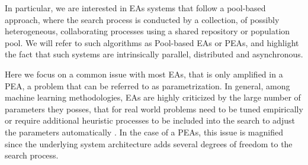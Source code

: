 \documentclass{llncs}
\begin{document}


In particular, we are interested in EAs systems that follow a pool-based approach, where the search process is conducted by a collection, of possibly heterogeneous, collaborating processes using a shared repository or population pool. We will refer to such algorithms as Pool-based EAs or PEAs, and highlight the fact that such systems are intrinsically parallel, distributed and asynchronous.

Here we focus on a common issue with most EAs, that is only amplified in a PEA, a problem that can be referred to as parametrization.
In general, among machine learning methodologies, EAs are highly criticized by the large number of parameters they posses,
that for real world problems need to be tuned empirically or require additional heuristic processes to be included into the search to
adjust the parameters automatically \cite{ss}.
In the case of a PEAs, this issue is magnified since the underlying system architecture adds several degrees of freedom to the search process.
\end{document}
